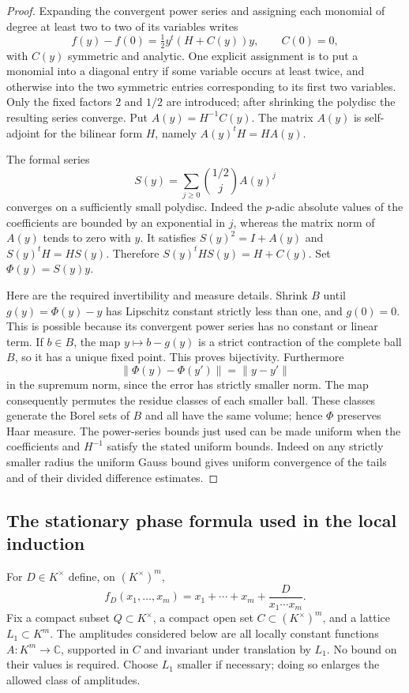 \begin{proof}
Expanding the convergent power series and assigning each monomial of
degree at least two to two of its variables writes
\[
 f(y)-f(0)=\tfrac12y^t(H+C(y))y,
 \qquad C(0)=0,
\]
with $C(y)$ symmetric and analytic.  One explicit assignment is to put a
monomial into a diagonal entry if some variable occurs at least twice,
and otherwise into the two symmetric entries corresponding to its
first two variables.  Only the fixed factors $2$ and $1/2$ are
introduced; after shrinking the polydisc the resulting series converge.
Put $A(y)=H^{-1}C(y)$.  The matrix $A(y)$ is self-adjoint for the
bilinear form $H$, namely $A(y)^tH=HA(y)$.

The formal series
\[
 S(y)=\sum_{j\ge0}\binom{1/2}{j}A(y)^j
\]
converges on a sufficiently small polydisc.  Indeed the $p$-adic
absolute values of the coefficients are bounded by an exponential in
$j$, whereas the matrix norm of $A(y)$ tends to zero with $y$.
It satisfies $S(y)^2=I+A(y)$ and $S(y)^tH=HS(y)$.  Therefore
$S(y)^tHS(y)=H+C(y)$.  Set $\Phi(y)=S(y)y$.

Here are the required invertibility and measure details.  Shrink $B$
until $g(y)=\Phi(y)-y$ has Lipschitz constant strictly less than one,
and $g(0)=0$.  This is possible because its convergent power series
has no constant or linear term.  If $b\in B$, the map
$y\mapsto b-g(y)$ is a strict contraction of the complete ball $B$,
so it has a unique fixed point.  This proves bijectivity.
Furthermore
\[
 \|\Phi(y)-\Phi(y')\|=\|y-y'\|
\]
in the supremum norm, since the error has strictly smaller norm.
The map consequently permutes the residue classes of each smaller
ball.  These classes generate the Borel sets of $B$ and all have
the same volume; hence $\Phi$ preserves Haar measure.  The power-series
bounds just used can be made uniform when the coefficients and
$H^{-1}$ satisfy the stated uniform bounds.  Indeed on any strictly
smaller radius the uniform Gauss bound gives uniform convergence of
the tails and of their divided difference estimates.
\end{proof}

\subsection{The stationary phase formula used in the local induction}

For $D\in K^\times$ define, on $(K^\times)^m$,
\[
 f_D(x_1,\ldots,x_m)=x_1+\cdots+x_m+
                         \frac{D}{x_1\cdots x_m}.
\]
Fix a compact subset $Q\subset K^\times$, a compact open set
$C\subset(K^\times)^m$, and a lattice $L_1\subset K^m$.
The amplitudes considered below are all locally constant functions
$A:K^m\to\mathbb C$, supported in $C$ and invariant under translation
by $L_1$.  No bound on their values is required.  Choose $L_1$ smaller
if necessary; doing so enlarges the allowed class of amplitudes.

